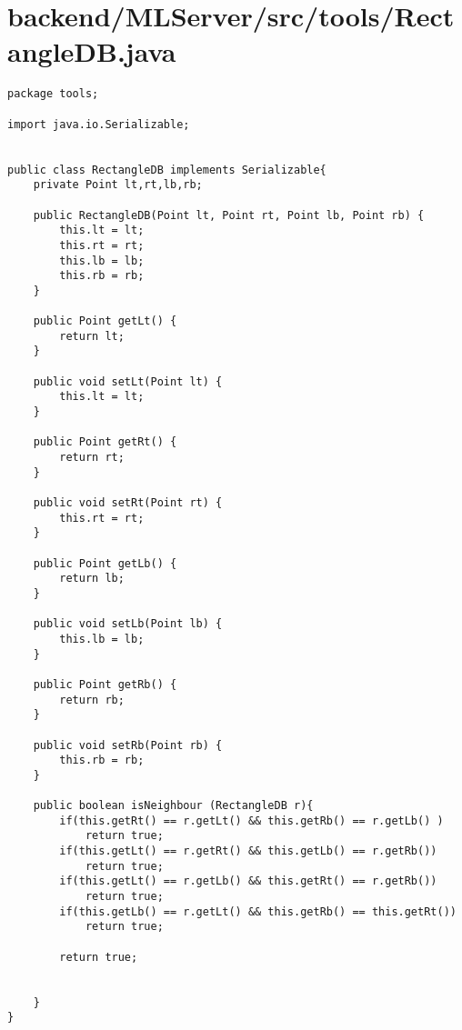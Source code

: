 \section{backend/MLServer/src/tools/RectangleDB.java}
\begin{lstlisting}package tools;

import java.io.Serializable;


public class RectangleDB implements Serializable{
    private Point lt,rt,lb,rb;

    public RectangleDB(Point lt, Point rt, Point lb, Point rb) {
        this.lt = lt;
        this.rt = rt;
        this.lb = lb;
        this.rb = rb;
    }

    public Point getLt() {
        return lt;
    }

    public void setLt(Point lt) {
        this.lt = lt;
    }

    public Point getRt() {
        return rt;
    }

    public void setRt(Point rt) {
        this.rt = rt;
    }

    public Point getLb() {
        return lb;
    }

    public void setLb(Point lb) {
        this.lb = lb;
    }

    public Point getRb() {
        return rb;
    }

    public void setRb(Point rb) {
        this.rb = rb;
    }

    public boolean isNeighbour (RectangleDB r){
        if(this.getRt() == r.getLt() && this.getRb() == r.getLb() )
            return true;
        if(this.getLt() == r.getRt() && this.getLb() == r.getRb())
            return true;
        if(this.getLt() == r.getLb() && this.getRt() == r.getRb())
            return true;
        if(this.getLb() == r.getLt() && this.getRb() == this.getRt())
            return true;

        return true;


    }
}
\end{lstlisting}
\newpage
